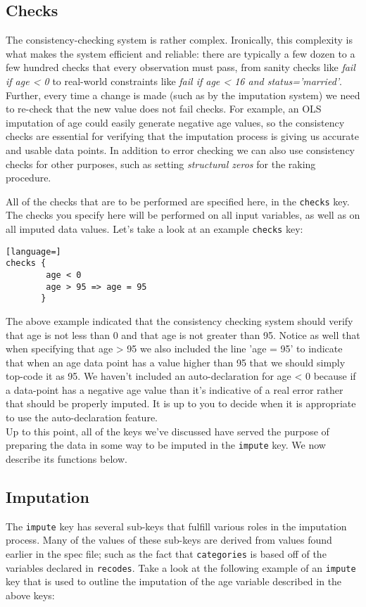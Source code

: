 \documentclass{article}
\begin{document}
\subsection{Checks}
The consistency-checking system is rather complex. Ironically, this complexity is what 
makes the system efficient and reliable: there are typically a
few dozen to a few hundred checks that every observation must pass, from sanity checks
like {\em fail if age < 0} to real-world constraints like {\em fail if age < 16 and
status='married'}. Further, every time a change is made (such as by the imputation system)
we need to re-check that the new value does not fail checks. For example, an OLS imputation of age
could easily generate negative age values, so the consistency checks are essential
for verifying that the imputation process is giving us accurate and usable data points. In addition 
to error checking we can also use consistency checks for other purposes, such as setting 
{\em structural zeros} for the raking procedure.

All of the checks that are to be performed are specified here, in the {\tt checks} key. 
The checks you specify here will be performed on all input variables, as well as on all 
imputed data values. Let's take a look at an example {\tt checks} key:

\begin{lstlisting}[language=]
checks {
    	age < 0
        age > 95 => age = 95
       }
\end{lstlisting}

The above example indicated that the consistency checking system should verify that 
age is not less than 0 and that age is not greater than 95. Notice as well that when specifying 
that age > 95 we also included the line 'age = 95' to indicate that when an age data point has 
a value higher than 95 that we should simply top-code it as 95. We haven't included an auto-declaration 
for age < 0 because if a data-point has a negative age value than it's indicative of a real error rather 
that should be properly imputed. It is up to you to decide when it is appropriate to use the 
auto-declaration feature.\\

Up to this point, all of the keys
we've discussed have served the purpose of preparing the data in some way to be imputed in the 
{\tt impute} key. We now describe its functions below.


\subsection{Imputation} \label{imputesec}
The {\tt impute} key has several sub-keys that fulfill various 
roles in the imputation process. Many of the values of these sub-keys are derived from values 
found earlier in the spec file; such as the fact that {\tt categories} is based off of 
the variables declared in {\tt recodes}. Take a look at the following example of an {\tt impute} key 
that is used to outline the imputation of the age variable described in the above keys:
\end{document}
